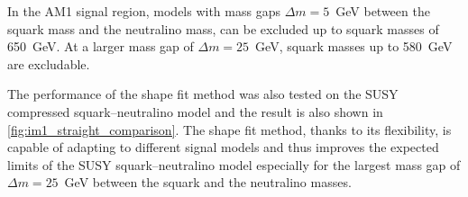 In the AM1 signal region, models with mass gaps $\Delta m = 5$~GeV between the
squark mass and the neutralino mass, can be excluded up to squark masses of
650~GeV. At a larger mass gap of $\Delta m = 25$~GeV, squark masses up to
580~GeV are excludable.

The performance of the shape fit method was also tested on the SUSY compressed
squark--neutralino model and the result is also shown in
\cref{fig:im1_straight_comparison}. The shape fit method, thanks to its
flexibility, is capable of adapting to different signal models and thus improves
the expected limits of the SUSY squark--neutralino model especially for the
largest mass gap of $\Delta m = 25$~GeV between the squark and the neutralino
masses.
